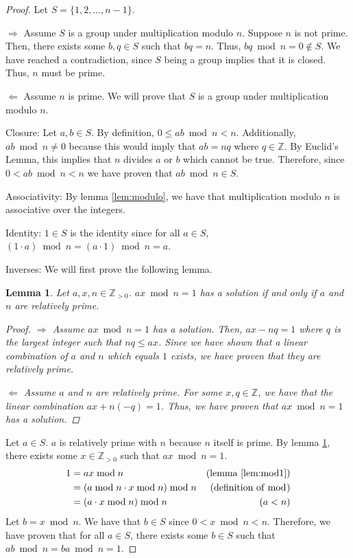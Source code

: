 \documentclass[12pt,reqno]{article}
\newcommand{\Z}{\mathbb{Z}}
\theoremstyle{plain}
\newtheorem{lemma}{Lemma}
\theoremstyle{definition}
\begin{document}
\begin{proof}
Let $S = \{1,2,\ldots,n-1\}$.

$\Rightarrow$ Assume $S$ is a group under multiplication modulo $n$. Suppose $n$ is not prime. Then, there exists some $b,q\in S$ such that $bq=n$. Thus, $bq\bmod{n}=0\notin S$. We have reached a contradiction, since $S$ being a group implies that it is closed. Thus, $n$ must be prime.

$\Leftarrow$ Assume $n$ is prime. We will prove that $S$ is a group under multiplication modulo $n$.

Closure: Let $a,b\in S$. By definition, $0\leq ab\bmod{n}<n$. Additionally, $ab\bmod{n}\neq 0$ because this would imply that $ab=nq$ where $q\in\Z$. By Euclid's Lemma, this implies that $n$ divides $a$ or $b$ which cannot be true. Therefore, since $0 < ab\bmod{n} < n$ we have proven that $ab\bmod{n}\in S$.

Associativity: By lemma \ref{lem:modulo}, we have that multiplication modulo $n$ is associative over the integers.

Identity: $1\in S$ is the identity since for all $a\in S$, $(1\cdot a)\bmod{n}=(a\cdot 1)\bmod{n}=a$.

Inverses: We will first prove the following lemma.
\begin{lemma}
    \label{lem:mod1}
    Let $a,x,n\in\Z_{>0}$. $ax\bmod{n}=1$ has a solution if and only if $a$ and $n$ are relatively prime.
    \begin{proof}
        $\Rightarrow$ Assume $ax\bmod{n}=1$ has a solution. Then, $ax-nq=1$ where $q$ is the largest integer such that $nq\leq ax$. Since we have shown that a linear combination of $a$ and $n$ which equals $1$ exists, we have proven that they are relatively prime.

        $\Leftarrow$ Assume $a$ and $n$ are relatively prime. For some $x,q\in\Z$, we have that the linear combination $ax + n(-q) = 1$. Thus, we have proven that $ax\bmod{n}=1$ has a solution.
    \end{proof}
\end{lemma}
Let $a\in S$. $a$ is relatively prime with $n$ because $n$ itself is prime. By lemma \ref{lem:mod1}, there exists some $x\in\Z_{>0}$ such that $ax\bmod{n}=1$.
\begin{align*}
    1 &= ax\bmod{n} & \text{(lemma \ref{lem:mod1})}\\
    &= (a\bmod{n} \cdot x\bmod{n})\bmod{n} & \text{(definition of $\bmod$)}\\
    &= (a \cdot x\bmod{n})\bmod{n} & \text{($a<n$)}
\end{align*}
Let $b=x\bmod{n}$. We have that $b\in S$ since $0<x\bmod{n}<n$. Therefore, we have proven that for all $a\in S$, there exists some $b\in S$ such that $ab\bmod{n}=ba\bmod{n}=1$.
\end{proof}
\end{document}
